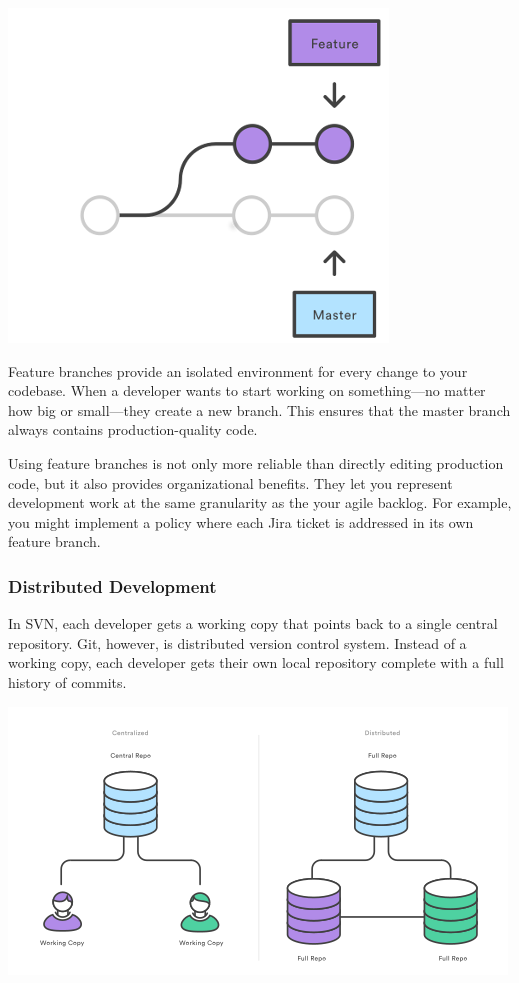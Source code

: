 \documentclass[11pt]{article}
\begin{document}
\begin{center}
\includegraphics[width=.9\linewidth]{./img/2.png}
\end{center}

Feature branches provide an isolated environment for every change to your codebase. When a developer wants to start working on something—no matter how big or small—they create a new branch. This ensures that the master branch always contains production-quality code.

Using feature branches is not only more reliable than directly editing production code, but it also provides organizational benefits. They let you represent development work at the same granularity as the your agile backlog. For example, you might implement a policy where each Jira ticket is addressed in its own feature branch.

\subsubsection{Distributed Development}
\label{sec:org2cb7e06}
In SVN, each developer gets a working copy that points back to a single central repository. Git, however, is  distributed version control system. Instead of a working copy, each developer gets their own local repository complete with a full history of commits.

\begin{center}
\includegraphics[width=.9\linewidth]{./img/3.png}
\end{center}
\end{document}
